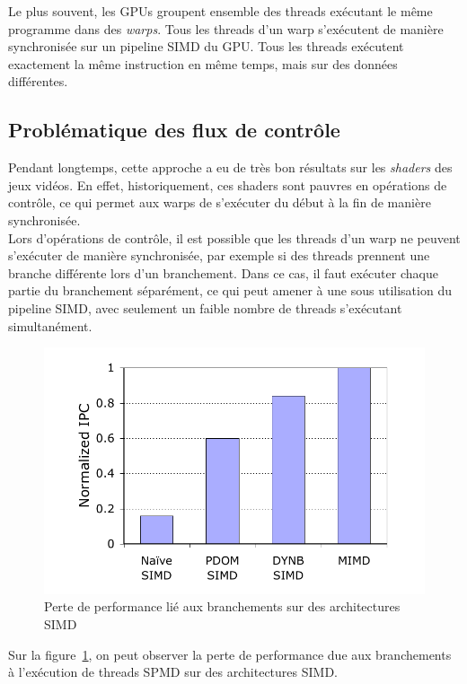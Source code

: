 \documentclass[11pt]{article}
\begin{document}
Le plus souvent, les GPUs groupent ensemble des threads exécutant le même programme dans des \emph{warps}. Tous les threads d'un warp s'exécutent de manière synchronisée sur un pipeline SIMD du GPU.
Tous les threads exécutent exactement la même instruction en même temps, mais sur des données différentes.

\subsection{Problématique des flux de contrôle}

Pendant longtemps, cette approche a eu de très bon résultats sur les \emph{shaders} des jeux vidéos. En effet, historiquement, ces shaders sont pauvres en opérations de contrôle, ce qui permet aux warps de s'exécuter du début à la fin de manière synchronisée.
\\Lors d'opérations de contrôle, il est possible que les threads d'un warp ne peuvent s'exécuter de manière synchronisée, par exemple si des threads prennent une branche différente lors d'un branchement.
Dans ce cas, il faut exécuter chaque partie du branchement séparément, ce qui peut amener à une sous utilisation du pipeline SIMD, avec seulement un faible nombre de threads s'exécutant simultanément.

\begin{figure}[h]
   \caption{\label{IPC} Perte de performance lié aux branchements sur des architectures SIMD}
   \includegraphics[scale=.6]{ipc}
\end{figure}

Sur la figure~\ref{IPC}, on peut observer la perte de performance due aux branchements à l'exécution de threads SPMD sur des architectures SIMD.
\end{document}
